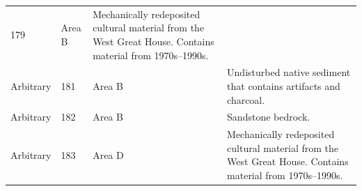 \documentclass[
  12pt,
]{krantz}
\begin{document}
\begin{longtable}[]{@{}llll@{}}
\begin{minipage}[t]{0.11\columnwidth}
179\strut
\end{minipage} & \begin{minipage}[t]{0.16\columnwidth}\raggedright
Area B\strut
\end{minipage} & \begin{minipage}[t]{0.38\columnwidth}\raggedright
Mechanically redeposited
cultural material from the
West Great House. Contains
material from 1970s--1990s.\strut
\end{minipage}\tabularnewline
\begin{minipage}[t]{0.18\columnwidth}\raggedright
Arbitrary\strut
\end{minipage} & \begin{minipage}[t]{0.11\columnwidth}\raggedright
181\strut
\end{minipage} & \begin{minipage}[t]{0.16\columnwidth}\raggedright
Area B\strut
\end{minipage} & \begin{minipage}[t]{0.38\columnwidth}\raggedright
Undisturbed native sediment
that contains artifacts and
charcoal.\strut
\end{minipage}\tabularnewline
\begin{minipage}[t]{0.18\columnwidth}\raggedright
Arbitrary\strut
\end{minipage} & \begin{minipage}[t]{0.11\columnwidth}\raggedright
182\strut
\end{minipage} & \begin{minipage}[t]{0.16\columnwidth}\raggedright
Area B\strut
\end{minipage} & \begin{minipage}[t]{0.38\columnwidth}\raggedright
Sandstone bedrock.\strut
\end{minipage}\tabularnewline
\begin{minipage}[t]{0.18\columnwidth}\raggedright
Arbitrary\strut
\end{minipage} & \begin{minipage}[t]{0.11\columnwidth}\raggedright
183\strut
\end{minipage} & \begin{minipage}[t]{0.16\columnwidth}\raggedright
Area D\strut
\end{minipage} & \begin{minipage}[t]{0.38\columnwidth}\raggedright
Mechanically redeposited
cultural material from the
West Great House. Contains
material from 1970s--1990s.\strut
\end{minipage}\tabularnewline

\end{longtable}
\end{document}
